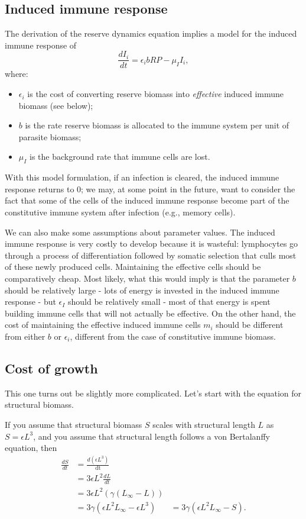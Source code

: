 \documentclass[11pt,reqno,final,pdftex]{amsart}\usepackage[]{graphicx}\usepackage[]{color}
\theoremstyle{plain}
\numberwithin{equation}{part}
\begin{document}
\subsection*{ Induced immune response}
The derivation of the reserve dynamics equation implies a model for the induced immune response of
\begin{equation}
\frac{dI_i}{dt}=\epsilon _ib R P-\mu _II_i,
\end{equation}
where:
\begin{itemize}
\item $\epsilon _i$ is the cost of converting reserve biomass into \textit{ effective }induced immune biomass (see below);
\item $b$ is the rate reserve biomass is allocated to the immune system per unit of parasite biomass;
\item $\mu _I$ is the background rate that immune cells are lost.
\end{itemize}

With this model formulation, if an infection is cleared, the induced immune response returns to 0; we may, at some point in the future, want to consider the fact that some of the cells of the induced immune response become part of the constitutive immune system after infection (e.g., memory cells).

We can also make some assumptions about parameter values.
The induced immune response is very costly to develop because it is wasteful: lymphocytes go through a process of differentiation followed by somatic selection that culls most of these newly produced cells.
Maintaining the effective cells should be comparatively cheap.
Most likely, what this would imply is that the parameter $b$ should be relatively large - lots of energy is invested in the induced immune response - but $\epsilon _I$ should be relatively small - most of that energy is spent building immune cells that will not actually be effective.
On the other hand, the cost of maintaining the effective induced immune cells $m_i$ should be different from either $b$ or $\epsilon_i$, different from the case of constitutive immune biomass.

\subsection*{Cost of growth}
This one turns out be slightly more complicated.
Let's start with the equation for structural biomass.

If you assume that structural biomass $S$ scales with structural length $L$ as $S =\epsilon L^3$, and you assume that structural length
follows a von Bertalanffy equation, then
\begin{align}
\frac{dS}{dt} &=\frac{d\left(\epsilon  L^3\right)}{\text{dt}} \\
& =3\epsilon  L^2 \frac{dL}{dt} \\
& =3 \epsilon  L^2 \left(\gamma \left(L_{\infty}-L\right)\right) \\
& =3 \gamma \left(\epsilon  L^2 L_{\infty}-\epsilon  L^3\right)
& =3 \gamma \left(\epsilon  L^2L_{\infty }-S\right).
\end{align}
\end{document}
